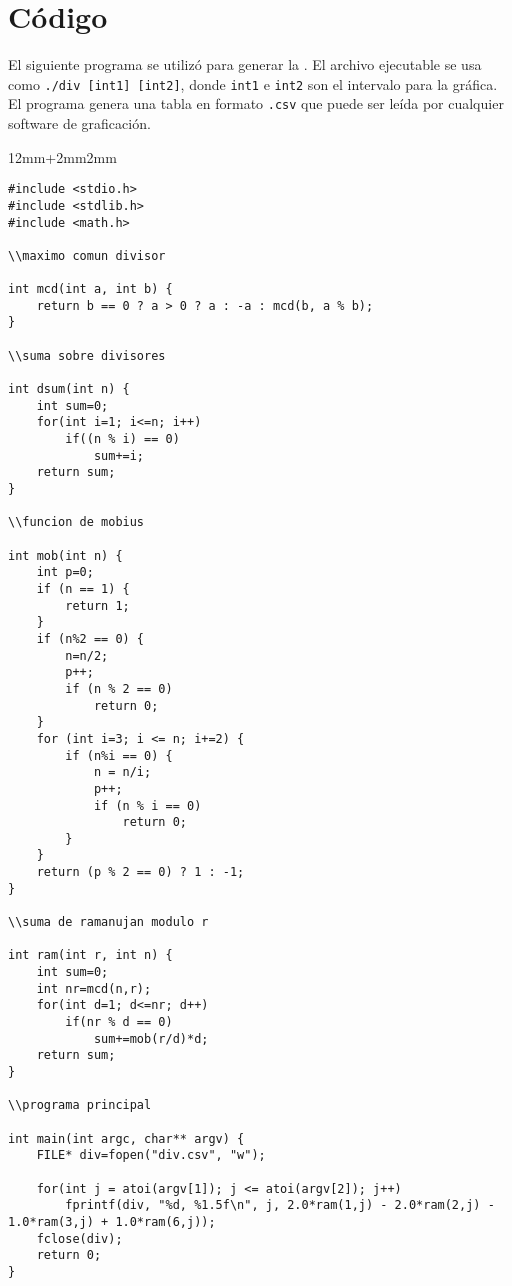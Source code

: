 
\section{Código}\label{sec:code}

El siguiente programa se utilizó para generar la . El archivo ejecutable se usa como \texttt{./div [int1] [int2]}, donde \texttt{int1} e \texttt{int2} son el intervalo para la gráfica. El programa genera una tabla en formato \texttt{.csv} que puede ser leída por cualquier software de graficación.

{
\footnotesize
\renewcommand\ttdefault{cmtt}
\begin{adjustwidth}{12mm+2mm}{2mm}
\begin{lstlisting}
#include <stdio.h>
#include <stdlib.h>
#include <math.h>

\\maximo comun divisor

int mcd(int a, int b) {
    return b == 0 ? a > 0 ? a : -a : mcd(b, a % b);
}

\\suma sobre divisores

int dsum(int n) {
    int sum=0;
    for(int i=1; i<=n; i++)
        if((n % i) == 0)
            sum+=i;
    return sum;
}

\\funcion de mobius

int mob(int n) {
    int p=0;
    if (n == 1) {
        return 1;
    }
    if (n%2 == 0) {
        n=n/2;
        p++;
        if (n % 2 == 0)
            return 0;
    }
    for (int i=3; i <= n; i+=2) {
        if (n%i == 0) {
            n = n/i;
            p++;
            if (n % i == 0)
                return 0;
        }
    }
    return (p % 2 == 0) ? 1 : -1;
}

\\suma de ramanujan modulo r

int ram(int r, int n) {
    int sum=0;
    int nr=mcd(n,r);
    for(int d=1; d<=nr; d++)
        if(nr % d == 0)
            sum+=mob(r/d)*d;
    return sum;
}

\\programa principal

int main(int argc, char** argv) {
    FILE* div=fopen("div.csv", "w");

    for(int j = atoi(argv[1]); j <= atoi(argv[2]); j++)
        fprintf(div, "%d, %1.5f\n", j, 2.0*ram(1,j) - 2.0*ram(2,j) - 1.0*ram(3,j) + 1.0*ram(6,j));
    fclose(div);
    return 0;
}

\end{lstlisting}
\end{adjustwidth}
}
\bigskip


